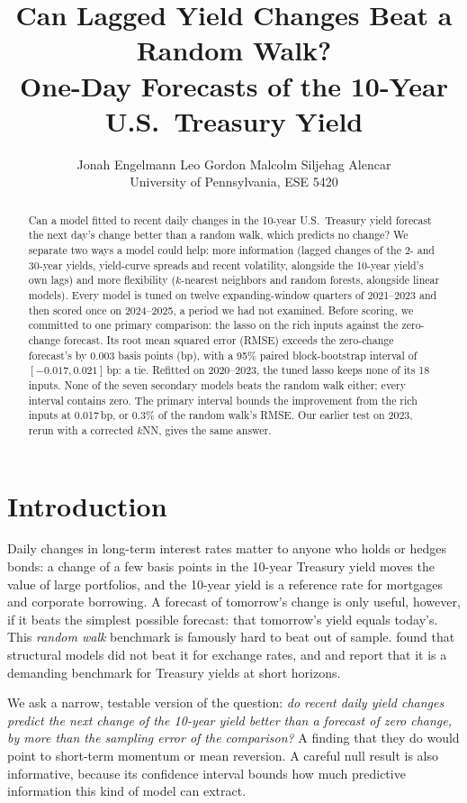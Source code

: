 \documentclass{article}
\title{Can Lagged Yield Changes Beat a Random Walk?\\
One-Day Forecasts of the 10-Year U.S.\ Treasury Yield}
\author{%
  Jonah Engelmann \qquad Leo Gordon \qquad Malcolm Siljehag Alencar \\
  \textmd{University of Pennsylvania, ESE 5420}
}
\begin{document}
\maketitle

\begin{abstract}
Can a model fitted to recent daily changes in the 10-year U.S.\ Treasury yield forecast the next day's change better than a random walk, which predicts no change? We separate two ways a model could help: more information (lagged changes of the 2- and 30-year yields, yield-curve spreads and recent volatility, alongside the 10-year yield's own lags) and more flexibility ($k$-nearest neighbors and random forests, alongside linear models). Every model is tuned on twelve expanding-window quarters of 2021--2023 and then scored once on 2024--2025, a period we had not examined. Before scoring, we committed to one primary comparison: the lasso on the rich inputs against the zero-change forecast. Its root mean squared error (RMSE) exceeds the zero-change forecast's by 0.003 basis points (bp), with a 95\% paired block-bootstrap interval of $[-0.017, 0.021]$\,bp: a tie. Refitted on 2020--2023, the tuned lasso keeps none of its 18 inputs. None of the seven secondary models beats the random walk either; every interval contains zero. The primary interval bounds the improvement from the rich inputs at 0.017\,bp, or 0.3\% of the random walk's RMSE. Our earlier test on 2023, rerun with a corrected $k$NN, gives the same answer.
\end{abstract}

\section{Introduction}
Daily changes in long-term interest rates matter to anyone who holds or hedges bonds: a change of a few basis points in the 10-year Treasury yield moves the value of large portfolios, and the 10-year yield is a reference rate for mortgages and corporate borrowing. A forecast of tomorrow's change is only useful, however, if it beats the simplest possible forecast: that tomorrow's yield equals today's. This \emph{random walk} benchmark is famously hard to beat out of sample. \citet{meese1983} found that structural models did not beat it for exchange rates, and \citet{duffee2002} and \citet{diebold2006} report that it is a demanding benchmark for Treasury yields at short horizons.

We ask a narrow, testable version of the question: \emph{do recent daily yield changes predict the next change of the 10-year yield better than a forecast of zero change, by more than the sampling error of the comparison?} A finding that they do would point to short-term momentum or mean reversion. A careful null result is also informative, because its confidence interval bounds how much predictive information this kind of model can extract.
\end{document}
